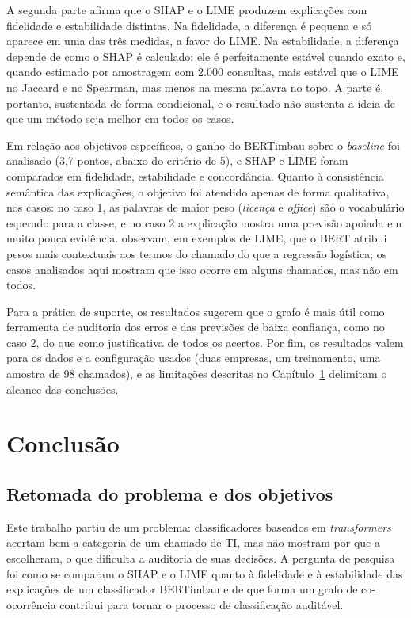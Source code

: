\documentclass[
    12pt,                %
    openright,           %
    oneside,             %
    a4paper,             %
    english,             %
    brazil               %
]{abntex2}
\begin{document}
A segunda parte afirma que o SHAP e o LIME produzem explicações com fidelidade e estabilidade distintas. Na fidelidade, a diferença é pequena e só aparece em uma das três medidas, a favor do LIME. Na estabilidade, a diferença depende de como o SHAP é calculado: ele é perfeitamente estável quando exato e, quando estimado por amostragem com 2.000 consultas, mais estável que o LIME no Jaccard e no Spearman, mas menos na mesma palavra no topo. A parte é, portanto, sustentada de forma condicional, e o resultado não sustenta a ideia de que um método seja melhor em todos os casos.
 
Em relação aos objetivos específicos, o ganho do BERTimbau sobre o \textit{baseline} foi analisado (3,7 pontos, abaixo do critério de 5), e SHAP e LIME foram comparados em fidelidade, estabilidade e concordância. Quanto à consistência semântica das explicações, o objetivo foi atendido apenas de forma qualitativa, nos casos: no caso 1, as palavras de maior peso (\textit{licença} e \textit{office}) são o vocabulário esperado para a classe, e no caso 2 a explicação mostra uma previsão apoiada em muito pouca evidência.  observam, em exemplos de LIME, que o BERT atribui pesos mais contextuais aos termos do chamado do que a regressão logística; os casos analisados aqui mostram que isso ocorre em alguns chamados, mas não em todos.
 
Para a prática de suporte, os resultados sugerem que o grafo é mais útil como ferramenta de auditoria dos erros e das previsões de baixa confiança, como no caso 2, do que como justificativa de todos os acertos. Por fim, os resultados valem para os dados e a configuração usados (duas empresas, um treinamento, uma amostra de 98 chamados), e as limitações descritas no Capítulo~\ref{cap:conclusao} delimitam o alcance das conclusões.

\chapter{Conclusão}
\label{cap:conclusao}

\section{Retomada do problema e dos objetivos}
Este trabalho partiu de um problema: classificadores baseados em \textit{transformers} acertam bem a categoria de um chamado de TI, mas não mostram por que a escolheram, o que dificulta a auditoria de suas decisões. A pergunta de pesquisa foi como se comparam o SHAP e o LIME quanto à fidelidade e à estabilidade das explicações de um classificador BERTimbau e de que forma um grafo de co-ocorrência contribui para tornar o processo de classificação auditável.
\end{document}
